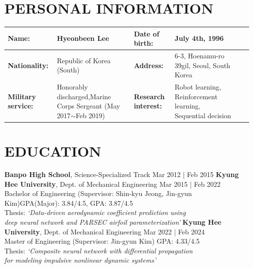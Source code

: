 \documentclass[a4paper,10pt]{extarticle}
\begin{document}
\renewcommand*{\arraystretch}{1.5}
\noindent
\section*{PERSONAL INFORMATION}
\begin{center}
    \vspace*{-0.8cm}
    \noindent
    \begin{longtable}{LRLRLR}
        \textbf{Name:}             & Hyeonbeen Lee                                                                           & \textbf{Date of birth:}     & July 4th, 1996                                              \\
        \hline
        \textbf{Nationality:}      & Republic of Korea (South)                                                               & \textbf{Address:}           & 6-3, Hoenamu-ro 39gil, Seoul, South Korea                  \\
        \hline
        \textbf{Military service:} & Honorably discharged,\linebreak Marine Corps Sergeant {\small (May 2017$\sim$Feb 2019)} & \textbf{Research interest:} & Robot learning, Reinforcement learning, Sequential decision \\
        \hline
    \end{longtable}
\end{center}

\section*{EDUCATION}
\noindent
\textbf{Banpo High School}, Science-Specialized Track \hfill Mar 2012 | Feb 2015
\newline
\textbf{Kyung Hee University}, Dept. of Mechanical Engineering \hfill Mar 2015 | Feb 2022\\ %
Bachelor of Engineering (Supervisor: Shin-kyu Jeong, Jin-gyun Kim)\hfill GPA(Major): 3.84/4.5, GPA: 3.87/4.5\\ %
Thesis: \textit{{\small `Data-driven aerodynamic coefficient prediction using}}\\
\hspace*{1.3cm}\textit{{\small deep neural
            network and PARSEC airfoil parameterization'}}
\newline
\textbf{Kyung Hee University}, Dept. of Mechanical Engineering \hfill Mar 2022 | Feb 2024\\ %
Master of Engineering (Supervisor: Jin-gyun Kim) \hfill GPA: 4.33/4.5\\ %
Thesis: \textit{{\small `Composite neural network with differential propagation}}\\
\hspace*{1.3cm}\textit{\small{for modeling impulsive nonlinear dynamic systems'}}
\end{document}
